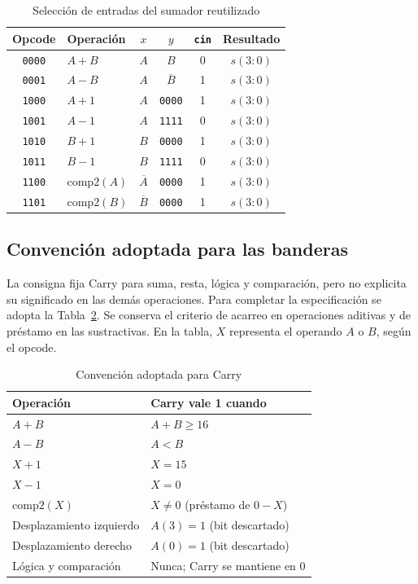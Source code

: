 \begin{table}[htbp]
\centering
\caption{Selección de entradas del sumador reutilizado}
\label{tab:operandos}
\small
\setlength{\tabcolsep}{4pt}
\begin{tabular}{clcccc}
\toprule
Opcode & Operación & $x$ & $y$ & \texttt{cin} & Resultado\\
\midrule
\texttt{0000} & $A+B$ & $A$ & $B$ & 0 & $s(3:0)$\\
\texttt{0001} & $A-B$ & $A$ & $\overline{B}$ & 1 & $s(3:0)$\\
\texttt{1000} & $A+1$ & $A$ & \texttt{0000} & 1 & $s(3:0)$\\
\texttt{1001} & $A-1$ & $A$ & \texttt{1111} & 0 & $s(3:0)$\\
\texttt{1010} & $B+1$ & $B$ & \texttt{0000} & 1 & $s(3:0)$\\
\texttt{1011} & $B-1$ & $B$ & \texttt{1111} & 0 & $s(3:0)$\\
\texttt{1100} & $\mathrm{comp2}(A)$ & $\overline{A}$ & \texttt{0000} & 1 & $s(3:0)$\\
\texttt{1101} & $\mathrm{comp2}(B)$ & $\overline{B}$ & \texttt{0000} & 1 & $s(3:0)$\\
\bottomrule
\end{tabular}
\end{table}

\subsection{Convención adoptada para las banderas}
La consigna fija Carry para suma, resta, lógica y comparación,
pero no explicita su significado en las demás operaciones.
Para completar la especificación se adopta la
Tabla~\ref{tab:carry}. Se conserva el criterio de acarreo en
operaciones aditivas y de préstamo en las sustractivas. En la tabla,
$X$ representa el operando $A$ o $B$, según el opcode.

\begin{table}[htbp]
\centering
\caption{Convención adoptada para Carry}
\label{tab:carry}
\small
\begin{tabular}{ll}
\toprule
Operación & Carry vale 1 cuando\\
\midrule
$A+B$ & $A+B\geq16$\\
$A-B$ & $A<B$\\
$X+1$ & $X=15$\\
$X-1$ & $X=0$\\
$\mathrm{comp2}(X)$ & $X\ne0$ (préstamo de $0-X$)\\
Desplazamiento izquierdo & $A(3)=1$ (bit descartado)\\
Desplazamiento derecho & $A(0)=1$ (bit descartado)\\
Lógica y comparación & Nunca; Carry se mantiene en 0\\
\bottomrule
\end{tabular}
\end{table}

